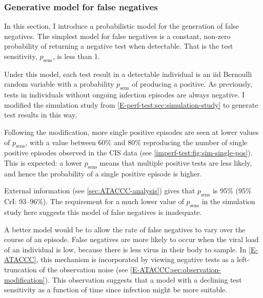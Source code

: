 \documentclass[12pt, letterpaper]{article} %
\newcommand{\psens}{p_\text{sens}}
\begin{document}
\subsubsection{Generative model for false negatives} \label{imperf-test:sec:simulate}


In this section, I introduce a probabilistic model for the generation of false negatives.
The simplest model for false negatives is a constant, non-zero probability of returning a negative test when detectable.
That is the test sensitivity, $\psens$, is less than 1.

Under this model, each test result in a detectable individual is an iid Bernoulli random variable with a probability $\psens$ of producing a positive.
As previously, tests in individuals without ongoing infection episodes are always negative.
I modified the simulation study from \cref{E-perf-test:sec:simulation-study} to generate test results in this way.

Following the modification, more single positive episodes are seen at lower values of $\psens$, with a value between 60\% and 80\% reproducing the number of single positive episodes observed in the CIS data (see \cref{imperf-test:fig:sim-single-pos}).
This is expected: a lower $\psens$ means that multiple positive tests are less likely, and hence the probability of a single positive episode is higher.

External information (see \cref{sec:ATACCC-analysis}) gives that $\psens$ is 95\% (95\% CrI: 93--96\%).
The requirement for a much lower value of $\psens$ in the simulation study here suggests this model of false negatives is inadequate.

A better model would be to allow the rate of false negatives to vary over the course of an episode.
False negatives are more likely to occur when the viral load of an individual is low, because there is less virus in their body to sample.
In \cref{E-ATACCC}, this mechanism is incorporated by viewing negative tests as a left-truncation of the observation noise (see \cref{E-ATACCC:sec:observation-modification}).
This observation suggests that a model with a declining test sensitivity as a function of time since infection might be more suitable.
\end{document}
